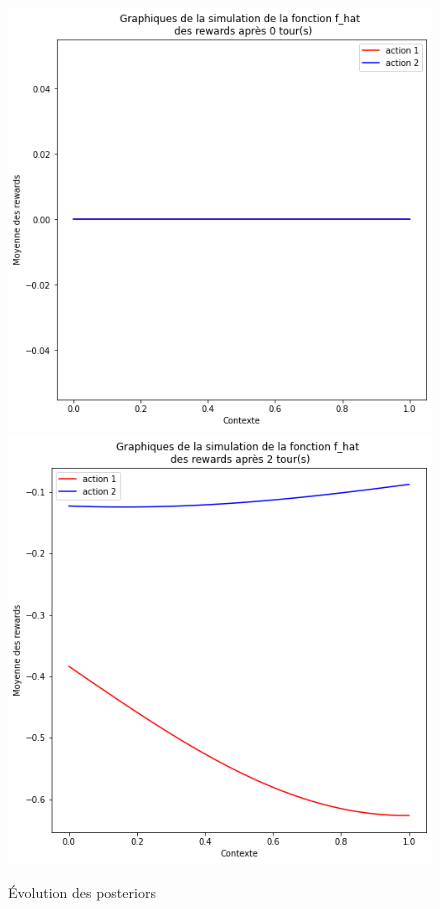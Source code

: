 \documentclass[letterpaper,11pt]{article}
\begin{document}
\begin{figure}[H]
\caption{Évolution des posteriors}
\label{figure: évolution des posteriors}
\begin{center}

\includegraphics[scale=0.45]{KTS-0-tour.png} \hfill \includegraphics[scale=0.45]{KTS-2-tours.png}


\end{center}
\end{figure}
\end{document}
